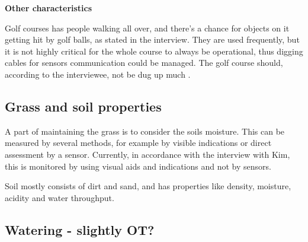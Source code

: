 \textbf{Other characteristics}

Golf courses has people walking all over, and there's a chance for objects on it getting hit by golf balls, as stated in the interview. They are used frequently, but it is not highly critical for the whole course to always be operational, thus digging cables for sensors communication could be managed. The golf course should, according to the interviewee, not be dug up much . 



\subsection{Grass and soil properties}

A part of maintaining the grass is to consider the soils moisture\cite{golfGrass}. This can be measured by several methods, for example by visible indications or direct assessment by a sensor. Currently, in accordance with the interview with Kim, this is monitored by using visual aids and indications and not by sensors. 

Soil mostly consists of dirt and sand, and has properties like density, moisture, acidity and water throughput.


\subsection{Watering - slightly OT?}
